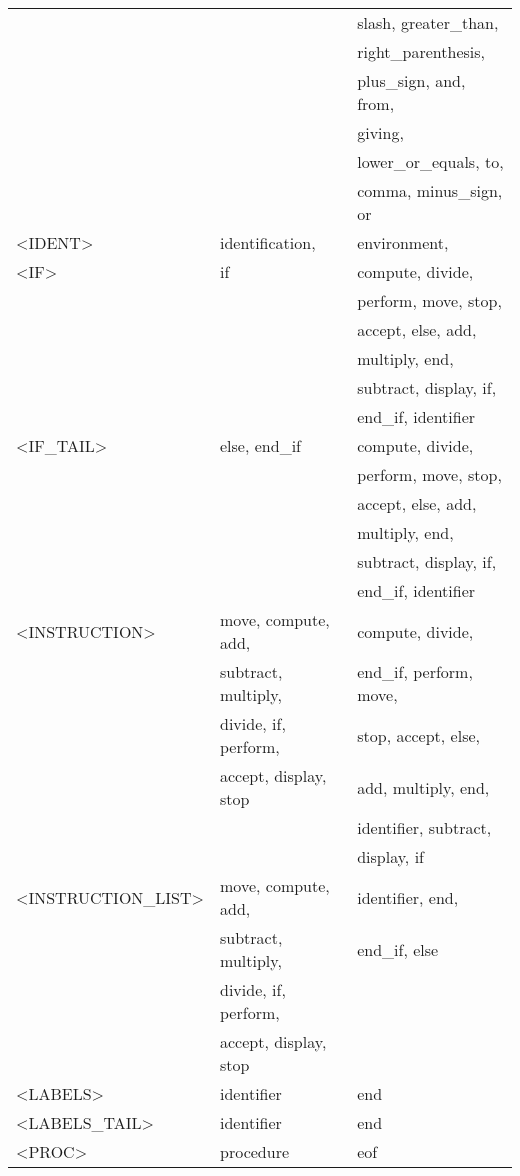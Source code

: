 \begin{longtable}{|l|l|l|}
  &  &   slash, greater\_than, \\ 
  &  &   right\_parenthesis, \\ 
  &  &   plus\_sign, and, from, \\ 
  &  &   giving, \\ 
  &  &   lower\_or\_equals, to, \\ 
  &  &   comma, minus\_sign, or \\ 
  \hline
<IDENT>  &  identification, &   environment, \\ 
  \hline
<IF>  &  if &   compute, divide, \\ 
  &  &   perform, move, stop, \\ 
  &  &   accept, else, add, \\ 
  &  &   multiply, end, \\ 
  &  &   subtract, display, if, \\ 
  &  &   end\_if, identifier \\ 
  \hline
<IF\_TAIL>  &  else, end\_if &   compute, divide, \\ 
  &  &   perform, move, stop, \\ 
  &  &   accept, else, add, \\ 
  &  &   multiply, end, \\ 
  &  &   subtract, display, if, \\ 
  &  &   end\_if, identifier \\ 
  \hline
<INSTRUCTION>  &  move, compute, add, &   compute, divide, \\ 
  &  subtract, multiply, &   end\_if, perform, move, \\ 
  &  divide, if, perform, &   stop, accept, else, \\ 
  &  accept, display, stop &   add, multiply, end, \\ 
  &  &   identifier, subtract, \\ 
  &  &   display, if \\ 
  \hline
<INSTRUCTION\_LIST>  &  move, compute, add, &   identifier, end, \\ 
  &  subtract, multiply, &   end\_if, else \\ 
  &  divide, if, perform, &   \\ 
  &  accept, display, stop &   \\ 
  \hline
<LABELS>  &  identifier &   end \\ 
  \hline
<LABELS\_TAIL>  &  identifier &   end \\ 
  \hline
<PROC>  &  procedure &   eof \\ 

\end{longtable}
